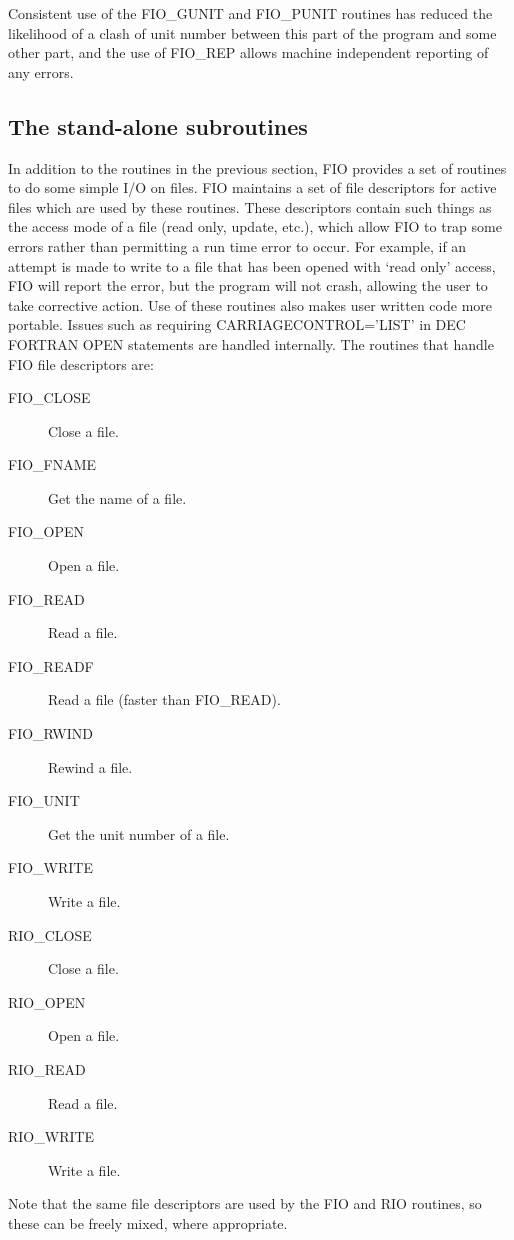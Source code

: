 \documentclass[twoside,11pt,nolof]{starlink}
\begin{document}
Consistent use of the FIO\_GUNIT and FIO\_PUNIT routines has reduced the
likelihood of a clash of unit number between this part of the program and some
other part, and the use of FIO\_REP allows machine independent reporting of
any errors.

\subsection{The stand-alone subroutines}

In addition to the routines in the previous section, FIO provides a set of
routines to do some simple I/O on files. FIO maintains a set of file
descriptors for active files which are used by these routines. These
descriptors contain such things as the access mode of a file (read only,
update, etc.), which allow FIO to trap some errors rather than permitting a run
time error to occur. For example, if an attempt is made to write to a file that
has been opened with `read only' access, FIO will report the error, but the
program will not crash, allowing the user to take corrective action. Use of
these routines also makes user written code more portable. Issues such as
requiring CARRIAGECONTROL='LIST' in DEC FORTRAN OPEN statements are handled
internally. The routines that handle FIO file descriptors are:

\begin{description}
\item[FIO\_CLOSE] Close a file.
\item[FIO\_FNAME] Get the name of a file.
\item[FIO\_OPEN] Open a file.
\item[FIO\_READ]  Read a file.
\item[FIO\_READF] Read a file (faster than FIO\_READ).
\item[FIO\_RWIND] Rewind a file.
\item[FIO\_UNIT] Get the unit number of a file.
\item[FIO\_WRITE] Write a file.
\item[RIO\_CLOSE] Close a file.
\item[RIO\_OPEN] Open a file.
\item[RIO\_READ]  Read a file.
\item[RIO\_WRITE] Write a file.
\end{description}

Note that the same file descriptors are used by the FIO and RIO routines, so
these can be freely mixed, where appropriate.
\end{document}
